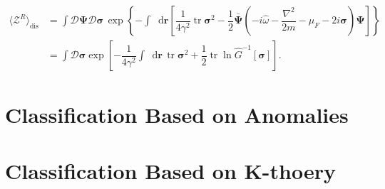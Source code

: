 \documentclass[10pt,nofootinbib,letterpaper]{revtex4}
\newcommand*\dd{\mathop{}\!\mathrm{d}}
\def\Z{\mathcal{Z}}
\def\D{\mathcal{D}}
\begin{document}
		\begin{align}\label{2.1.9}
			\langle \Z^R\rangle_{\text{dis}}&=\int\D\bm{\Psi}\D\bm{\sigma}\,\exp \left\{-\int\dd\bm{r}\left[\dfrac{1}{4\gamma^2}\mathop{\mathrm{tr}}\bm{\sigma}^2-\dfrac{1}{2}\bm{\bar\Psi}\left(-i\hat{\omega}-\dfrac{\nabla^2}{2m}-\mu_F-2i\bm{\sigma}\right)\bm{\Psi}\right]\right\}\nonumber\\
			&=\int\D\bm{\sigma}\exp\left[-\dfrac{1}{4\gamma^2}\int\dd\bm{r}\,\mathop{\mathrm{tr}}\bm{\sigma}^2+\dfrac{1}{2}\mathop{\mathrm{tr}}\ln\hat{G}^{-1}[\bm{\sigma}]\right].
		\end{align}





\section{Classification Based on Anomalies}
	
\section{Classification Based on K-thoery}



\end{document}
